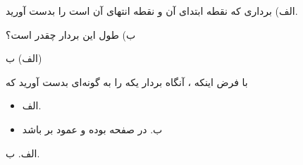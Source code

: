 
\begin{ELexample}{}

الف) برداری که نقطه ابتدای آن  و نقطه انتهای آن  است را بدست آورید.

ب) طول این بردار چقدر است؟

\begin{ELsolution}


الف)
ب)

\end{ELsolution}

\end{ELexample}


\begin{ELexample}{}

با فرض اینکه ، آنگاه بردار یکه  را به گونه‌ای بدست آورید که

\begin{itemize}
\tightlist
\item
  الف. 
\item
  ب.  در صفحه  بوده و عمود بر  باشد
\end{itemize}

\begin{ELsolution}

الف.
ب.

\end{ELsolution}

\end{ELexample}

